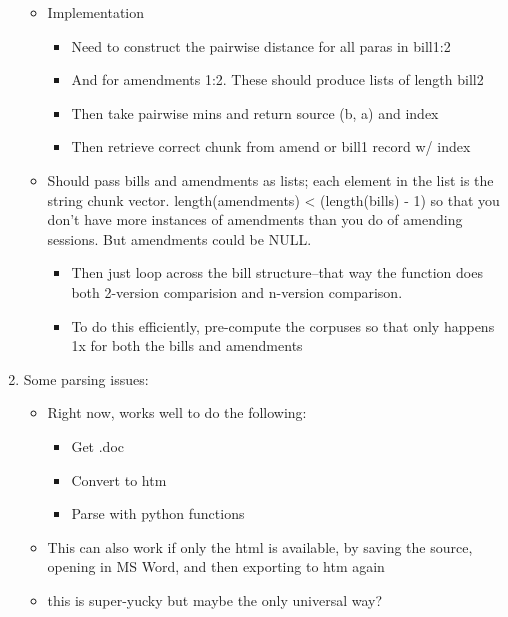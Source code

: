 \documentclass[11pt]{article}
\begin{document}
\begin{enumerate}
\begin{itemize}
\item Implementation

\begin{itemize}
\item Need to construct the pairwise distance for all paras in bill1:2
\item And for amendments 1:2. These should produce lists of length bill2
\item Then take pairwise mins and return source (b, a) and index
\item Then retrieve correct chunk from amend or bill1 record w/ index
\end{itemize}

\item Should pass bills and amendments as lists; each element in the
     list is the string chunk vector. length(amendments) <
     (length(bills) - 1) so that you don't have more instances of
     amendments than you do of amending sessions. But amendments could
     be NULL.

\begin{itemize}
\item Then just loop across the bill structure--that way the function
       does both 2-version comparision and n-version comparison.
\item To do this efficiently, pre-compute the corpuses so that only
       happens 1x for both the bills and amendments
\end{itemize}

\end{itemize}

\item Some parsing issues:

\begin{itemize}
\item Right now, works well to do the following:

\begin{itemize}
\item Get .doc
\item Convert to htm
\item Parse with python functions
\end{itemize}

\item This can also work if only the html is available, by saving the
     source, opening in MS Word, and then exporting to htm again
\item this is super-yucky but maybe the only universal way?
\end{itemize}

\end{enumerate}
\end{document}
